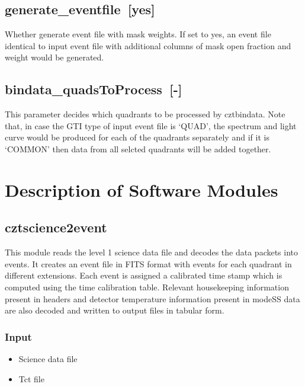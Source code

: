 \documentclass[11pt,oneside,a4paper]{article}
\begin{document}
\subsection*{generate\_eventfile~[yes]}
    Whether generate event file with mask weights. If set to yes, an event file identical to 
input event file with additional columns of mask open fraction and weight would be generated.
\subsection*{bindata\_quadsToProcess~[-]}
    This parameter decides which quadrants to be processed by cztbindata. Note that, in case 
the GTI type of input event file is `QUAD', the spectrum and light curve would be produced for 
each of the quadrants separately and if it is `COMMON' then data from all selcted quadrants will 
be added together.


\section{Description of Software Modules}


\subsection{cztscience2event}

This   module   reads   the   level 1   science   data   file   and   decodes   the   data   packets   into  
events. It  creates  an  event  file  in  FITS  format  with  events  for  each  quadrant  in  different  
extensions. Each event is assigned a calibrated time stamp which is computed using the
time calibration table. Relevant housekeeping information present in headers and detector temperature 
information present in modeSS data are also decoded and written to output files in tabular form.

\subsubsection*{Input}
\renewcommand\labelitemi{{\boldmath$\cdot$}}
\begin{itemize}
\item{Science data file}
\item{Tct file}
\end{itemize}
\end{document}
